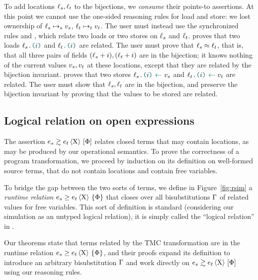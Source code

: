 To add locations $\datalangLoc_s, \datalangLoc_t$ to the bijections, we \emph{consume} their points-to assertions. At this point we cannot use the one-sided reasoning rules for load and store: we lost ownership of $\datalangLoc_s \iPointsto_s \datalangVal_s$, $\datalangLoc_t \iPointsto_t \datalangVal_t$.
%
The user must instead use the synchronized rules  and , which relate two loads or two stores on $\datalangLoc_s$ and $\datalangLoc_t$.
%
 proves that two loads $\datalangLoad{\datalangLoc_s}{\datalangIdx}$ and $\datalangLoad{\datalangLoc_t}{\datalangIdx}$ are related. The user must prove that $\datalangLoc_s \iSimilar \datalangLoc_t$, that is, that all three pairs of fields $(\datalangLoc_s + \datalangIdx), (\datalangLoc_t + \datalangIdx)$ are in the bijection; it knows nothing of the current values $\datalangVal_s, \datalangVal_t$ at these locations, except that they are related by the bijection invariant.
%
 proves that two stores $\datalangStore{\datalangLoc_s}{\datalangIdx}{\datalangVal_s}$ and $\datalangStore{\datalangLoc_t}{\datalangIdx}{\datalangVal_t}$ are related. The user must show that $\datalangLoc_s, \datalangLoc_t$ are in the bijection, and preserve the bijection invariant by proving that the values to be stored are related.




\subsection{Logical relation on open expressions}

The assertion $\iSim[\iProt]{\iPred}{\datalangExpr_s}{\datalangExpr_t}$ relates closed terms that may contain locations, as may be produced by our operational semantics. To prove the correctness of a program transformation, we proceed by induction on its definition on well-formed source terms, that do not contain locations and contain free variables.

To bridge the gap between the two sorts of terms, we define in Figure~\ref{fig:rsim} a \emph{runtime relation} $\iRsimv[\iProt]{\iPred}{\datalangExpr_s}{\datalangExpr_t}$ that closes over all bisubstitutions $\datalangBisubst$ of related values for free variables. This sort of definition is standard (considering our simulation as an untyped logical relation), it is simply called the ``logical relation'' in \Simuliris.

Our theorems state that terms related by the TMC transformation are in the runtime relation $\iRsimv[\iProt]{\iPred}{\datalangExpr_s}{\datalangExpr_t}$, and their proofs expand its definition to introduce an arbitrary bisubstitution $\datalangBisubst$ and work directly on $\iSim[\iProt]{\iPred}{\datalangExpr_s}{\datalangExpr_t}$ using our reasoning rules.

